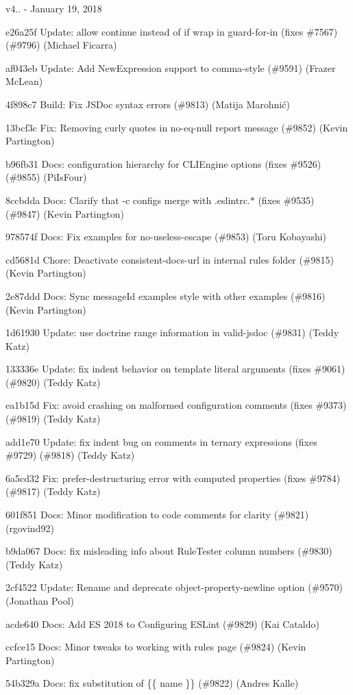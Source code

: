 v4.. -\/ January 19, 2018


\begin{DoxyItemize}
\item e26a25f Update\+: allow continue instead of if wrap in guard-\/for-\/in (fixes \#7567) (\#9796) (Michael Ficarra)
\item af043eb Update\+: Add New\+Expression support to comma-\/style (\#9591) (Frazer Mc\+Lean)
\item 4f898c7 Build\+: Fix J\+S\+Doc syntax errors (\#9813) (Matija Marohnić)
\item 13bcf3c Fix\+: Removing curly quotes in no-\/eq-\/null report message (\#9852) (Kevin Partington)
\item b96fb31 Docs\+: configuration hierarchy for C\+L\+I\+Engine options (fixes \#9526) (\#9855) (Pi\+Is\+Four)
\item 8ccbdda Docs\+: Clarify that -\/c configs merge with {\ttfamily .eslintrc.$\ast$} (fixes \#9535) (\#9847) (Kevin Partington)
\item 978574f Docs\+: Fix examples for no-\/useless-\/escape (\#9853) (Toru Kobayashi)
\item cd5681d Chore\+: Deactivate consistent-\/docs-\/url in internal rules folder (\#9815) (Kevin Partington)
\item 2e87ddd Docs\+: Sync message\+Id examples\textquotesingle{} style with other examples (\#9816) (Kevin Partington)
\item 1d61930 Update\+: use doctrine range information in valid-\/jsdoc (\#9831) (Teddy Katz)
\item 133336e Update\+: fix indent behavior on template literal arguments (fixes \#9061) (\#9820) (Teddy Katz)
\item ea1b15d Fix\+: avoid crashing on malformed configuration comments (fixes \#9373) (\#9819) (Teddy Katz)
\item add1e70 Update\+: fix indent bug on comments in ternary expressions (fixes \#9729) (\#9818) (Teddy Katz)
\item 6a5cd32 Fix\+: prefer-\/destructuring error with computed properties (fixes \#9784) (\#9817) (Teddy Katz)
\item 601f851 Docs\+: Minor modification to code comments for clarity (\#9821) (rgovind92)
\item b9da067 Docs\+: fix misleading info about Rule\+Tester column numbers (\#9830) (Teddy Katz)
\item 2cf4522 Update\+: Rename and deprecate object-\/property-\/newline option (\#9570) (Jonathan Pool)
\item acde640 Docs\+: Add ES 2018 to Configuring E\+S\+Lint (\#9829) (Kai Cataldo)
\item ccfce15 Docs\+: Minor tweaks to working with rules page (\#9824) (Kevin Partington)
\item 54b329a Docs\+: fix substitution of \{\{ name \}\} (\#9822) (Andres Kalle)
\end{DoxyItemize}

